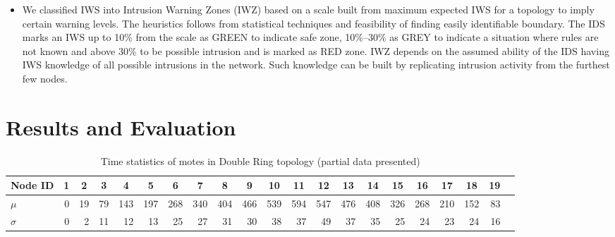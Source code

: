 \documentclass{CRPITStyle}
\newcommand*{\bd}[1]{\multicolumn{1}{|c|}{\bfseries #1}}
\begin{document}
\begin{itemize}
\item We classified IWS into Intrusion Warning Zones (IWZ) based on a scale built from maximum expected IWS for a topology to imply certain warning levels.
The heuristics follows from statistical techniques and feasibility of finding easily identifiable boundary.
The IDS marks an IWS up to 10\% from the scale as GREEN to indicate safe zone,
10\%--30\% as GREY to indicate a situation where rules are not known and 
above 30\% to be possible intrusion and is marked as RED zone.
IWZ depends on the assumed ability of the IDS having IWS knowledge of all possible intrusions in the network.
Such knowledge can be built by replicating intrusion activity from the furthest few nodes.
\end{itemize}

\section{Results and Evaluation}
\label{sec:eval}

\begin{table}[t!]
\centering
\begin{tabular}{|l|*{19}{r|}r|}
\hline
\bd{Node ID}           & \bd{1} & \bd{2} & \bd{3} & \bd{4} & \bd{5} & \bd{6} & \bd{7} & \bd{8} & \bd{9} & \bd{10} & \bd{11} & \bd{12} & \bd{13} & \bd{14} & \bd{15} & \bd{16} & \bd{17} & \bd{18} & \bd{19} \\ %
\hline
$\mu$            & 0 &19 & 79& 143&197 &268&340&404&466&539 &594 &547 &476 &408 &326 & 268&210 & 152 & 83 \\ %
$\sigma$		 & 0 & 2 & 11 & 12 & 13 & 25& 27&31 &30 & 38 & 37 & 49 & 37 & 35 & 25  & 24 & 23 & 24 & 16 \\ %
\hline
\end{tabular}
\caption{Time statistics of motes in Double Ring topology (partial data presented)}
\label{tab:stat_ellip}
\end{table}

\end{document}
